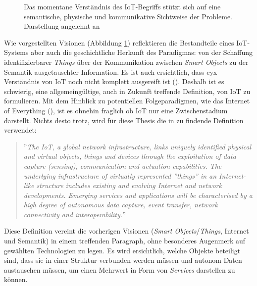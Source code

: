 \begin{figure}
    \centering
    \caption{Das momentane Verständnis des \ac{IoT}-Begriffs stützt sich auf eine semantische, physische und kommunikative Sichtweise der Probleme. Darstellung angelehnt an \cite{atzori2010internet}}
    \label{fig:visions}
\end{figure}


Wie vorgestellten Visionen (Abbildung \ref{fig:visions}) reflektieren die Bestandteile eines \ac{IoT}-Systems aber auch die geschichtliche Herkunft des Paradigmas: von der Schaffung identifizierbarer \textit{Things} über der Kommunikation zwischen \textit{Smart Objects} zu der Semantik ausgetauschter Information. Es ist auch ersichtlich, dass cyx Verständnis von \ac{IoT} noch nicht komplett ausgereift ist (\cite{atzori2010internet}). Deshalb ist es schwierig, eine allgemeingültige, auch in Zukunft treffende Definition, von \ac{IoT} zu formulieren. Mit dem Hinblick zu potentiellen Folgeparadigmen, wie das Internet of Everything (\cite{Snyder2017}), ist es ohnehin fraglich ob \ac{IoT} nur eine Zwischenstadium darstellt. Nichts desto trotz, wird für diese Thesis die in \cite{Misra2017} zu findende Definition verwendet: 
\begin{quote}
   ''\textit{The \ac{IoT}, a global network infrastructure, links uniquely identified physical and virtual objects, things and devices through the exploitation of data capture (sensing), communication and actuation capabilities. The underlying infrastructure of virtually represented ''things'' in an Internet-like structure includes existing and evolving Internet and network developments. Emerging services and applications will be characterised by a high degree of autonomous data capture, event transfer, network connectivity and interoperability.}''
\end{quote}

Diese Definition vereint die vorherigen Visionen (\textit{Smart Objects}/\textit{Things}, Internet und Semantik) in einem treffenden Paragraph, ohne besonderes Augenmerk auf gewählten Technologien zu legen. Es wird ersichtlich, welche Objekte beteiligt sind, dass sie in einer Struktur verbunden werden müssen und autonom Daten austauschen müssen, um einen Mehrwert in Form von \textit{Services} darstellen zu können. 


